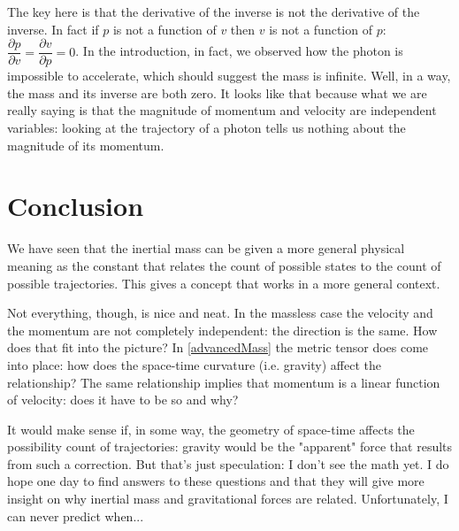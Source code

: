\documentclass[aps,pra,10pt,floatfix,nofootinbib]{revtex4-1}
\theoremstyle{definition}
\begin{document}
The key here is that the derivative of the inverse is not the derivative of the inverse. In fact if $p$ is not a function of $v$ then $v$ is not a function of $p$: $\dfrac{\partial p}{\partial v} = \dfrac{\partial v}{\partial p} = 0$. In the introduction, in fact, we observed how the photon is impossible to accelerate, which should suggest the mass is infinite. Well, in a way, the mass and its inverse are both zero. It looks like that because what we are really saying is that the magnitude of momentum and velocity are independent variables: looking at the trajectory of a photon tells us nothing about the magnitude of its momentum.

\section{Conclusion}

We have seen that the inertial mass can be given a more general physical meaning as the constant that relates the count of possible states to the count of possible trajectories. This gives a concept that works in a more general context.

Not everything, though, is nice and neat. In the massless case the velocity and the momentum are not completely independent: the direction is the same. How does that fit into the picture? In \eqref{advancedMass} the metric tensor does come into place: how does the space-time curvature (i.e. gravity) affect the relationship? The same relationship implies that momentum is a linear function of velocity: does it have to be so and why?

It would make sense if, in some way, the geometry of space-time affects the possibility count of trajectories: gravity would be the "apparent" force that results from such a correction. But that's just speculation: I don't see the math yet. I do hope one day to find answers to these questions and that they will give more insight on why inertial mass and gravitational forces are related. Unfortunately, I can never predict when...
\end{document}
